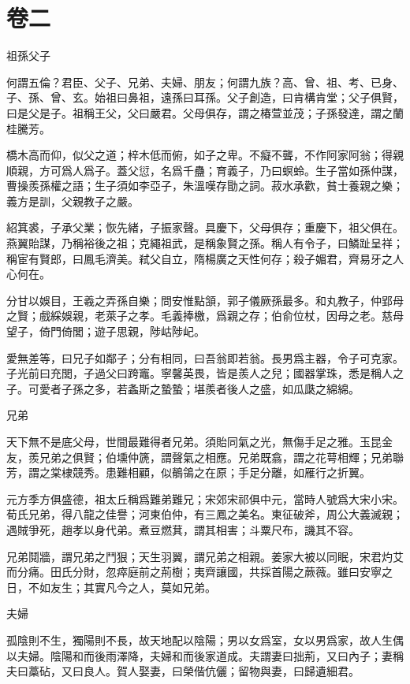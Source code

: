 \documentclass[12pt,a4paper]{ctexbook}
\begin{document}
\section{卷二}
祖孫父子\par
何謂五倫？君臣、父子、兄弟、夫婦、朋友；何謂九族？高、曾、祖、考、已身、子、孫、曾、玄。始祖曰鼻祖，遠孫曰耳孫。父子創造，曰肯構肯堂；父子俱賢，曰是父是子。祖稱王父，父曰嚴君。父母俱存，謂之椿萱並茂；子孫發達，謂之蘭桂騰芳。\par
橋木高而仰，似父之道；梓木低而俯，如子之卑。不癡不聾，不作阿家阿翁；得親順親，方可爲人爲子。蓋父愆，名爲千蠱；育義子，乃曰螟蛉。生子當如孫仲謀，曹操羨孫權之語；生子須如李亞子，朱溫嘆存勖之詞。菽水承歡，貧士養親之樂；義方是訓，父親教子之嚴。\par
紹箕裘，子承父業；恢先緒，子振家聲。具慶下，父母俱存；重慶下，祖父俱在。燕翼貽謀，乃稱裕後之祖；克繩祖武，是稱象賢之孫。稱人有令子，曰鱗趾呈祥；稱宦有賢郎，曰鳳毛濟美。弒父自立，隋楊廣之天性何存；殺子媚君，齊易牙之人心何在。\par
分甘以娛目，王羲之弄孫自樂；問安惟點頷，郭子儀厥孫最多。和丸教子，仲郢母之賢；戲綵娛親，老萊子之孝。毛義捧檄，爲親之存；伯俞位杖，因母之老。慈母望子，倚門倚閭；遊子思親，陟岵陟屺。\par
愛無差等，曰兄子如鄰子；分有相同，曰吾翁即若翁。長男爲主器，令子可克家。子光前曰充閭，子過父曰跨竈。寧馨英畏，皆是羨人之兒；國器掌珠，悉是稱人之子。可愛者子孫之多，若螽斯之蟄蟄；堪羨者後人之盛，如瓜瓞之綿綿。\par
兄弟\par
天下無不是底父母，世間最難得者兄弟。須貽同氣之光，無傷手足之雅。玉昆金友，羨兄弟之俱賢；伯壎仲篪，謂聲氣之相應。兄弟既翕，謂之花萼相輝；兄弟聯芳，謂之棠棣競秀。患難相顧，似鶺鴒之在原；手足分離，如雁行之折翼。\par
元方季方俱盛德，祖太丘稱爲難弟難兄；宋郊宋祁俱中元，當時人號爲大宋小宋。荀氏兄弟，得八龍之佳譽；河東伯仲，有三鳳之美名。東征破斧，周公大義滅親；遇賊爭死，趙孝以身代弟。煮豆燃萁，謂其相害；斗粟尺布，譏其不容。\par
兄弟鬩牆，謂兄弟之鬥狠；天生羽翼，謂兄弟之相親。姜家大被以同眠，宋君灼艾而分痛。田氏分財，忽瘁庭前之荊樹；夷齊讓國，共採首陽之蕨薇。雖曰安寧之日，不如友生；其實凡今之人，莫如兄弟。\par
夫婦\par
孤陰則不生，獨陽則不長，故天地配以陰陽；男以女爲室，女以男爲家，故人生偶以夫婦。陰陽和而後雨澤降，夫婦和而後家道成。夫謂妻曰拙荊，又曰內子；妻稱夫曰藁砧，又曰良人。賀人娶妻，曰榮偕伉儷；留物與妻，曰歸遺細君。\par
\end{document}
